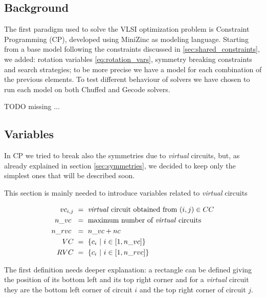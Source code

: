 
\subsection{Background}
    The first paradigm used to solve the VLSI optimization problem is Constraint Programming (CP),
    developed using MiniZinc as modeling language. 
    Starting from a base model following the constraints discussed in \ref{sec:shared_constraints},
    we added: rotation variables \ref{eq:rotation_vars}, symmetry breaking constraints and search strategies;
    to be more precise we have a model for each combination of the previous elements.
    To test different behaviour of solvers we have chosen to run each model on both Chuffed and Gecode solvers.

    \colorbox{BurntOrange}{TODO missing ...}


\subsection{Variables}
    In CP we tried to break also the symmetries due to \textit{virtual} circuits, but, as already
    explained in section \ref{sec:symmetries}, we decided to keep only the simplest ones that will 
    be described soon.

    This section is mainly needed to introduce variables related to \textit{virtual} circuits
    
    \begin{align}
        vc_{i,j}    &\ =\ \text{\textit{virtual} circuit obtained from  } (i,j) \in CC  \\
        n\_vc\      &\ =\ \text{maximum number of \textit{virtual} circuits}            \\
        n\_rvc\     &\ =\ n\_vc + nc                                                    \\
        VC          &\ =\ \{ c_i\ |\ i \in [1,n\_vc] \}                                 \\
        RVC         &\ =\ \{ c_i\ |\ i \in [1,n\_rvc] \}                                \\
    \end{align}

    The first definition needs deeper explanation: a rectangle can be defined giving the position
    of its bottom left and its top right corner and for a \textit{virtual} circuit they are the
    bottom left corner of circuit $i$ and the top right corner of circuit $j$.
    

